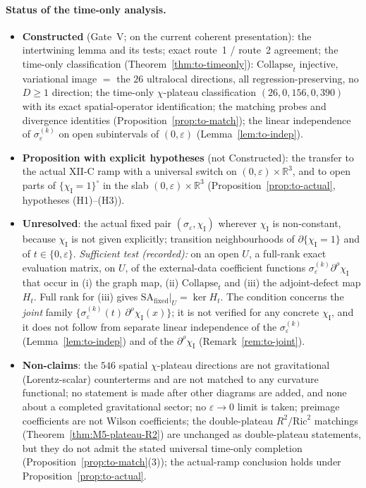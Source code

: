\documentclass{article}
\theoremstyle{remark}
\newcommand{\sigeps}{\sigma_\varepsilon}
\newcommand{\chiI}{\chi_{\mathrm I}}
\newcommand{\Coll}{\mathrm{Collapse}}
\begin{document}
\paragraph{Status of the time-only analysis.}
\begin{itemize}
\item \textbf{Constructed} (Gate~V; on the current coherent presentation):
the intertwining lemma and its tests; exact route~1 / route~2 agreement;
the time-only classification (Theorem~\ref{thm:to-timeonly}): $\Coll_t$ injective, variational image $=$ the $26$ ultralocal directions, all regression-preserving, no $D\ge1$ direction;
the time-only $\chi$-plateau classification $(26,0,156,0,390)$ with its exact spatial-operator identification;
the matching probes and divergence identities (Proposition~\ref{prop:to-match});
the linear independence of $\sigeps^{(k)}$ on open subintervals of $(0,\varepsilon)$ (Lemma~\ref{lem:to-indep}).
\item \textbf{Proposition with explicit hypotheses} (not Constructed): the transfer to the actual XII-C ramp with a universal switch on $(0,\varepsilon)\times\mathbb R^3$, and to open parts of $\{\chiI=1\}^\circ$ in the slab $(0,\varepsilon)\times\mathbb R^3$ (Proposition~\ref{prop:to-actual}, hypotheses (H1)--(H3)).
\item \textbf{Unresolved}:
the actual fixed pair $(\sigeps,\chiI)$ wherever $\chiI$ is non-constant, because $\chiI$ is not given explicitly;
transition neighbourhoods of $\partial\{\chiI=1\}$ and of $t\in\{0,\varepsilon\}$.
\emph{Sufficient test (recorded):} on an open $U$, a full-rank exact evaluation matrix, on $U$, of the external-data coefficient functions $\sigeps^{(k)}\partial^\rho\chiI$ that occur in (i) the graph map, (ii) $\Coll_t$ and (iii) the adjoint-defect map $H_t$.
Full rank for (iii) gives $\mathrm{SA}_{\mathrm{fixed}}|_U=\ker H_t$.
The condition concerns the \emph{joint} family $\{\sigeps^{(k)}(t)\,\partial^\rho\chiI(x)\}$; it is not verified for any concrete $\chiI$, and it does not follow from separate linear independence of the $\sigeps^{(k)}$ (Lemma~\ref{lem:to-indep}) and of the $\partial^\rho\chiI$ (Remark~\ref{rem:to-joint}).
\item \textbf{Non-claims}:
the $546$ spatial $\chi$-plateau directions are not gravitational (Lorentz-scalar) counterterms and are not matched to any curvature functional;
no statement is made after other diagrams are added, and none about a completed gravitational sector;
no $\varepsilon\to0$ limit is taken;
preimage coefficients are not Wilson coefficients;
the double-plateau $R^2/\mathrm{Ric}^2$ matchings (Theorem~\ref{thm:M5-plateau-R2}) are unchanged as double-plateau statements, but they do not admit the stated universal time-only completion (Proposition~\ref{prop:to-match}(3)); the actual-ramp conclusion holds under Proposition~\ref{prop:to-actual}.
\end{itemize}
\end{document}
